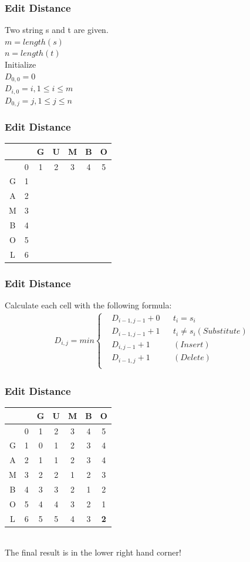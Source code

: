 \begin{frame}[fragile]
\frametitle{Edit Distance}
Two string s and t are given.\\
$m = length(s)$\\
$n = length(t)$\\
\vspace{3mm}
Initialize\\
$D_{0,0} = 0$\\
$D_{i,0} = i, 1 \leq i \leq m$\\
$D_{0,j} = j, 1 \leq j \leq n$
\end{frame}

\begin{frame}[fragile]
\frametitle{Edit Distance}
\begin{tabular}{|c|c|c|c|c|c|c|}
\hline
 & & G & U & M & B & O\\
\hline
 & 0 & 1 & 2 & 3 & 4 & 5\\
\hline
G & 1 & & & & &\\
\hline
A & 2 & & & & &\\
\hline
M & 3 & & & & &\\
\hline
B & 4 & & & & &\\
\hline
O & 5 & & & & &\\
\hline
L & 6 & & & & &\\
\hline
\end{tabular}
\end{frame}

\begin{frame}[fragile]
\frametitle{Edit Distance}
Calculate each cell with the following formula:
\begin{align}
D_{i,j}= min \left\{
\begin{aligned} & D_{i-1,j-1} + 0 & & t_i = s_i\\
& D_{i-1,j-1} + 1 & & t_i \neq s_i (Substitute)\\
& D_{i,j-1} + 1 & & (Insert)\\
& D_{i-1,j} + 1 & & (Delete)\\
\end{aligned}\right.
\end{align}
\end{frame}

\begin{frame}[fragile]
\frametitle{Edit Distance}
\begin{tabular}{|c|c|c|c|c|c|c|}
\hline
 & & G & U & M & B & O\\
\hline
 & 0 & 1 & 2 & 3 & 4 & 5\\
\hline
G & 1 & 0 & 1 & 2 & 3 & 4\\
\hline
A & 2 & 1 & 1 & 2 & 3 & 4\\
\hline
M & 3 & 2 & 2 & 1 & 2 & 3\\
\hline
B & 4 & 3 & 3 & 2 & 1 & 2\\
\hline
O & 5 & 4 & 4 & 3 & 2 & 1\\
\hline
L & 6 & 5 & 5 & 4 & 3 & {\bf 2}\\
\hline
\end{tabular}\\
\vspace{3mm}
The final result is in the lower right hand corner!
\end{frame}

